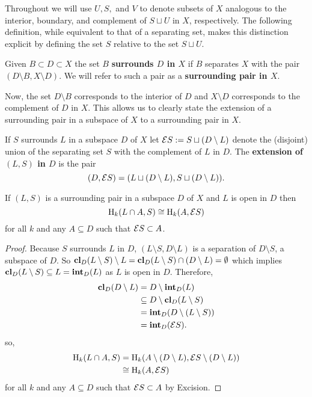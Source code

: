Throughout we will use $U, S,$ and $V$ to denote subsets of $X$ analogous to the interior, boundary, and complement of $S\sqcup U$ in $X$, respectively.
The following definition, while equivalent to that of a separating set, makes this distinction explicit by defining the set $S$ relative to the set $S\sqcup U$.

\begin{definition}[Surrounding]
  Given $B\subset D \subset X$ the set $B$ \textbf{surrounds $D$ in $X$} if $B$ separates $X$ with the pair $(D\setminus B, X\setminus D)$.
  We will refer to such a pair as a \textbf{surrounding pair in $X$}.
\end{definition}

Now, the set $D\setminus B$ corresponds to the interior of $D$ and $X\setminus D$ corresponds to the complement of $D$ in $X$.
This allows us to clearly state the extension of a surrounding pair in a subspace of $X$ to a surrounding pair in $X$.

\begin{definition}[Extension]
  If $S$ surrounds $L$ in a subspace $D$ of $X$ let $\mathcal{E} S := S\sqcup (D\setminus L)$ denote the (disjoint) union of the separating set $S$ with the complement of $L$ in $D$.
  The \textbf{extension of $(L, S)$ in $D$} is the pair
  \[ (D, \mathcal{E} S) = (L\sqcup (D\setminus L), S\sqcup (D\setminus L)).\]
\end{definition}

\begin{lemma}\label{lem:excision}
  If $(L, S)$ is a surrounding pair in a subspace $D$ of $X$ and $L$ is open in $D$ then
  \[ \mathrm{H}_k(L\cap A, S) \cong \mathrm{H}_k(A, \mathcal{E} S) \]
  for all $k$ and any $A\subseteq D$ such that $\mathcal{E} S\subset A$.
\end{lemma}
\begin{proof}
  Because $S$ surrounds $L$ in $D$, $(L\setminus S, D\setminus L)$ is a separation of $D\setminus S$, a subspace of $D$.
  So $\mathbf{cl}_D(L\setminus S)\setminus L = \mathbf{cl}_D(L\setminus S) \cap (D\setminus L) = \emptyset$ which implies $\mathbf{cl}_D(L\setminus S)\subseteq L = \mathbf{int}_D(L)$ as $L$ is open in $D$.
  Therefore,
  \begin{align*}
    \mathbf{cl}_D(D\setminus L) &= D\setminus \mathbf{int}_D(L)\\
                        &\subseteq D\setminus \mathbf{cl}_D(L\setminus S)\\
                        &= \mathbf{int}_D(D\setminus (L\setminus S))\\
                        &= \mathbf{int}_D(\mathcal{E} S).
  \end{align*}
  so,
  \begin{align*}
    \mathrm{H}_k(L\cap A, S) &= \mathrm{H}_k(A\setminus (D\setminus L), \mathcal{E} S\setminus (D\setminus L))\\
      &\cong \mathrm{H}_k(A, \mathcal{E} S)
  \end{align*}
  for all $k$ and any $A\subseteq D$ such that $\mathcal{E} S\subset A$ by Excision.
\end{proof}

